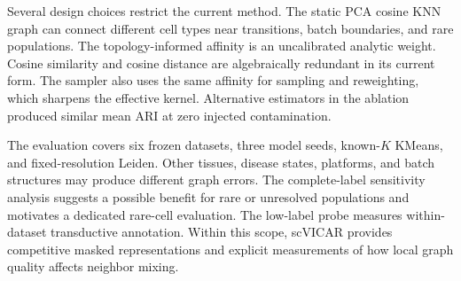 Several design choices restrict the current method. The static PCA cosine KNN
graph can connect different cell types near transitions, batch boundaries, and
rare populations. The topology-informed affinity is an uncalibrated analytic
weight. Cosine similarity and cosine distance are algebraically redundant in
its current form. The sampler also uses the same affinity for sampling and
reweighting, which sharpens the effective kernel. Alternative estimators in the
ablation produced similar mean ARI at zero injected contamination.

The evaluation covers six frozen datasets, three model seeds, known-$K$
KMeans, and fixed-resolution Leiden. Other tissues, disease states, platforms,
and batch structures may produce different graph errors. The complete-label
sensitivity analysis suggests a possible benefit for rare or unresolved
populations and motivates a dedicated rare-cell evaluation. The low-label
probe measures within-dataset transductive annotation. Within this scope,
scVICAR provides competitive masked representations and explicit measurements
of how local graph quality affects neighbor mixing.
